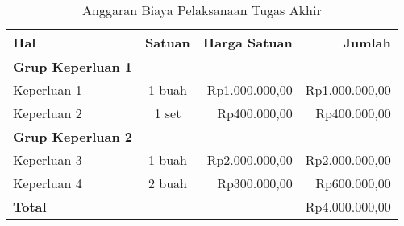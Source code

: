 \begin{table}[htbp]
	\small
	\centering
	\caption{Anggaran Biaya Pelaksanaan Tugas Akhir}
	\label{table:contoh_anggaran}
	\begin{tabular}{lcrr}
		\toprule
		\multicolumn{1}{l}{\textbf{Hal}} & \multicolumn{1}{l}{\textbf{Satuan}} & \multicolumn{1}{l}{\textbf{Harga Satuan}} & \multicolumn{1}{r}{\textbf{Jumlah}}\\
		\midrule
		\textbf{Grup Keperluan 1} \\
		Keperluan 1 & 1 buah & Rp1.000.000,00 & Rp1.000.000,00 \\
		Keperluan 2 & 1 set & Rp400.000,00 & Rp400.000,00 \\
		\midrule
		\textbf{Grup Keperluan 2} \\
		Keperluan 3 & 1 buah & Rp2.000.000,00 & Rp2.000.000,00 \\
		Keperluan 4 & 2 buah & Rp300.000,00 & Rp600.000,00 \\
		\midrule
		\textbf{Total} & & & Rp4.000.000,00 \\
		\bottomrule
	\end{tabular}
\end{table}